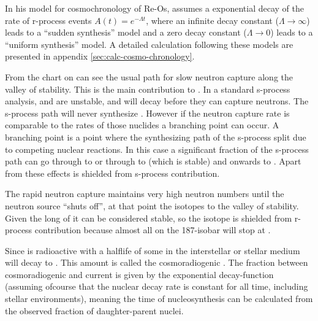 In his model for cosmochronology of Re-Os,  assumes a exponential decay of the rate of r-process events $A(t) = e^{-\Lambda t}$, where an infinite decay constant ($\Lambda\rightarrow\infty$) leads to a ``sudden synthesis'' model and a zero decay constant ($\Lambda\rightarrow 0$) leads to a ``uniform synthesis'' model.
A detailed calculation following these models are presented in appendix \ref{sec:calc-cosmo-chronology}.

\iffalse
{}
From the chart on can see the usual path for slow neutron capture along the valley of stability.
This is the main contribution to . In a standard s-process analysis,  and  are unstable, and will decay before they can capture neutrons. The s-process path will never synthesize . However if the neutron capture rate is comparable to the \betadecay rates of those nuclides a branching point can occur. A branching point is a point where the synthesizing path of the s-process split due to competing nuclear reactions. In this case a significant fraction of the s-process path can go through  to  or through  to  (which is stable) and onwards to . Apart from these effects  is shielded from s-process contribution.

The rapid neutron capture maintains very high neutron numbers until the neutron source ``shuts off'', at that point the isotopes \betadecay to the valley of stability. Given the long \halflife of  it can be considered stable, so the  isotope is shielded from r-process contribution because almost all \betadecay on the 187-isobar will stop at .

Since  is radioactive with a halflife of  some  in the interstellar or stellar medium will decay to . This amount is called the cosmoradiogenic . The fraction between cosmoradiogenic  and current  is given by the exponential decay-function (assuming ofcourse that the nuclear decay rate is constant for all time, including stellar environments), meaning the time of nucleosynthesis can be calculated from the observed fraction of daughter-parent nuclei.

